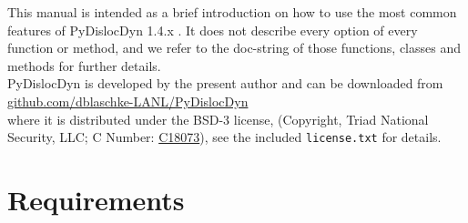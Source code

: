 \documentclass[11pt,letterpaper,oneside]{article}
\begin{document}
\noindent
This manual is intended as a brief introduction on how to use the most common features of PyDislocDyn 1.4.x \cite{pydislocdyn,Blaschke:2025joss}.
It does not describe every option of every function or method, and we refer to the doc-string of those functions, classes and methods for further details.
\\
PyDislocDyn is developed by the present author and can be downloaded from
\\\href{https://github.com/dblaschke-LANL/PyDislocDyn}{github.com/dblaschke-LANL/PyDislocDyn}\\
where it is distributed under the BSD-3 license, (Copyright, Triad National Security, LLC; C Number: \href{https://doi.org/10.11578/dc.20180619.15}{C18073}), see the included \verb|license.txt| for details.


\section{Requirements}
\end{document}
